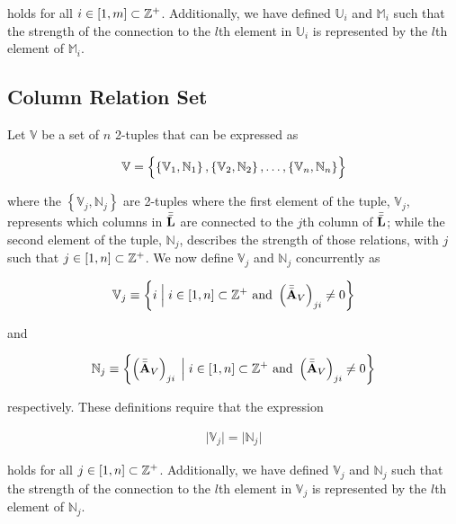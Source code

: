\documentclass[../ClusteringConnectionsMAIN.tex]{subfiles}
\begin{document}
\begin{flushleft}
\begin{large}
holds for all $i \in \left[ 1, m \right] \subset \mathbb{Z}^+$.  Additionally, we have defined $\mathbb{U}_i$ and $\mathbb{M}_i$ such that the strength of the connection to the $l$th element in $\mathbb{U}_i$ is represented by the $l$th element of $\mathbb{M}_i$.


\subsection{Column Relation Set}

Let $\mathbb{V}$ be a set of $n$ 2-tuples that can be expressed as

\begin{align*}
\mathbb{V} = \Bigl\{ \left\{ \mathbb{V}_1, \mathbb{N}_1 \right\}, \left\{ \mathbb{V}_2, \mathbb{N}_2 \right\}, \dots, \left\{ \mathbb{V}_n, \mathbb{N}_n \right\} \Bigr\}
\end{align*}

where the $\left\{ \mathbb{V}_j, \mathbb{N}_j \right\}$ are 2-tuples where the first element of the tuple, $\mathbb{V}_j$, represents which columns in $\bar{\bar{\mathbf{L}}}$ are connected to the $j$th column of $\bar{\bar{\mathbf{L}}}$; while the second element of the tuple, $\mathbb{N}_j$, describes the strength of those relations, with $j$ such that $j \in \left[ 1, n \right] \subset \mathbb{Z}^+$.  We now define $\mathbb{V}_j$ and $\mathbb{N}_j$ concurrently as

\begin{align}
\mathbb{V}_j \equiv \left\{ i \; \Bigl| \Bigr. \; i \in \left[ 1, n \right] \subset \mathbb{Z}^+ \text{  and  } \left( \bar{\bar{\mathbf{A}}}_V \right)_{ji} \neq 0 \right\}
\end{align}

and

\begin{align}
\mathbb{N}_j \equiv \left\{ \left( \bar{\bar{\mathbf{A}}}_V \right)_{ji} \; \Bigl| \Bigr. \; i \in \left[ 1, n \right] \subset \mathbb{Z}^+ \text{  and  } \left( \bar{\bar{\mathbf{A}}}_V \right)_{ji} \neq 0 \right\}
\end{align}

respectively.  These definitions require that the expression

\begin{align*}
\bigl| \mathbb{V}_j \bigr| = \bigl| \mathbb{N}_j \bigr|
\end{align*}

holds for all $j \in \left[ 1, n \right] \subset \mathbb{Z}^+$.  Additionally, we have defined $\mathbb{V}_j$ and $\mathbb{N}_j$ such that the strength of the connection to the $l$th element in $\mathbb{V}_j$ is represented by the $l$th element of $\mathbb{N}_j$.


\end{large}
\end{flushleft}
\end{document}
